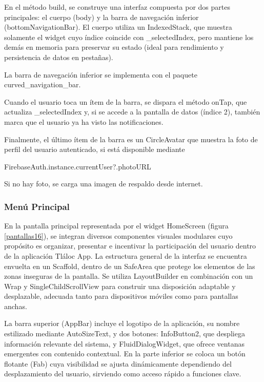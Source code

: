 En el método build, se construye una interfaz compuesta por dos partes principales: el cuerpo (body) y la barra de navegación inferior (bottomNavigationBar). El cuerpo utiliza un IndexedStack, que muestra solamente el widget cuyo índice coincide con \_selectedIndex, pero mantiene los demás en memoria para preservar su estado (ideal para rendimiento y persistencia de datos en pestañas).

La barra de navegación inferior se implementa con el paquete curved\_navigation\_bar.

Cuando el usuario toca un ítem de la barra, se dispara el método onTap, que actualiza \_selectedIndex y, si se accede a la pantalla de datos (índice 2), también marca que el usuario ya ha visto las notificaciones.

Finalmente, el último ítem de la barra es un CircleAvatar que muestra la foto de perfil del usuario autenticado, si está disponible mediante 
\begin{center}
  FirebaseAuth.instance.currentUser?.photoURL
\end{center}
Si no hay foto, se carga una imagen de respaldo desde internet.

\newpage
\subsubsection{Menú Principal} 

En la pantalla principal representada por el widget HomeScreen (figura \ref{pantallas16}), se integran diversos componentes visuales modulares cuyo propósito es organizar, presentar e incentivar la participación del usuario dentro de la aplicación Tláloc App. La estructura general de la interfaz se encuentra envuelta en un Scaffold, dentro de un SafeArea que protege los elementos de las zonas inseguras de la pantalla. Se utiliza LayoutBuilder en combinación con un Wrap y SingleChildScrollView para construir una disposición adaptable y desplazable, adecuada tanto para dispositivos móviles como para pantallas anchas.

La barra superior (AppBar) incluye el logotipo de la aplicación, su nombre estilizado mediante AutoSizeText, y dos botones: InfoButton2, que despliega información relevante del sistema, y FluidDialogWidget, que ofrece ventanas emergentes con contenido contextual. En la parte inferior se coloca un botón flotante (Fab) cuya visibilidad se ajusta dinámicamente dependiendo del desplazamiento del usuario, sirviendo como acceso rápido a funciones clave.

